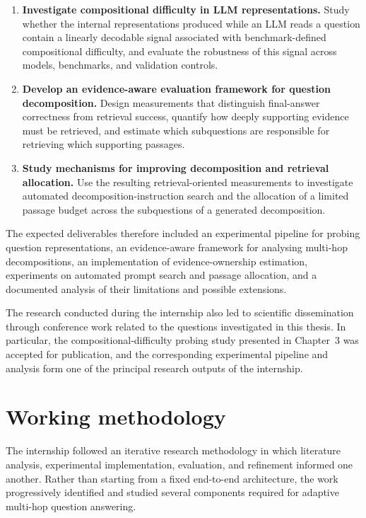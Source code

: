 \begin{enumerate}
    \item \textbf{Investigate compositional difficulty in LLM
    representations.}
    Study whether the internal representations produced while an LLM reads a
    question contain a linearly decodable signal associated with
    benchmark-defined compositional difficulty, and evaluate the robustness of
    this signal across models, benchmarks, and validation controls.

    \item \textbf{Develop an evidence-aware evaluation framework for question
    decomposition.}
    Design measurements that distinguish final-answer correctness from
    retrieval success, quantify how deeply supporting evidence must be
    retrieved, and estimate which subquestions are responsible for retrieving
    which supporting passages.

    \item \textbf{Study mechanisms for improving decomposition and retrieval
    allocation.}
    Use the resulting retrieval-oriented measurements to investigate automated
    decomposition-instruction search and the allocation of a limited passage
    budget across the subquestions of a generated decomposition.
\end{enumerate}

The expected deliverables therefore included an experimental pipeline for
probing question representations, an evidence-aware framework for analysing
multi-hop decompositions, an implementation of evidence-ownership estimation,
experiments on automated prompt search and passage allocation, and a documented
analysis of their limitations and possible extensions.

The research conducted during the internship also led to scientific
dissemination through conference work related to the questions investigated in
this thesis. In particular, the compositional-difficulty probing study presented
in Chapter~3 was accepted for publication, and the corresponding experimental
pipeline and analysis form one of the principal research outputs of the
internship.

\section{Working methodology}
\label{sec:ch1-methodology}

The internship followed an iterative research methodology in which literature
analysis, experimental implementation, evaluation, and refinement informed one
another. Rather than starting from a fixed end-to-end architecture, the work
progressively identified and studied several components required for adaptive
multi-hop question answering.

